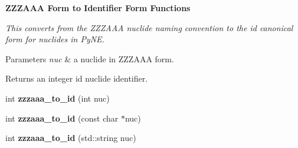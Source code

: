 \begin{Indent}{\bf Z\+Z\+Z\+A\+AA Form to Identifier Form Functions}\par
{\em This converts from the Z\+Z\+Z\+A\+AA nuclide naming convention to the id canonical form for nuclides in Py\+NE. 
\begin{DoxyParams}{Parameters}
{\em nuc} & a nuclide in Z\+Z\+Z\+A\+AA form. \\
\hline
\end{DoxyParams}
\begin{DoxyReturn}{Returns}
an integer id nuclide identifier. 
\end{DoxyReturn}
}\begin{DoxyCompactItemize}
\item 
int {\bfseries zzzaaa\+\_\+to\+\_\+id} (int nuc)\hypertarget{namespacepyne_1_1nucname_a655aba032448b6a33135b0e7a49e98ad}{}\label{namespacepyne_1_1nucname_a655aba032448b6a33135b0e7a49e98ad}

\item 
int {\bfseries zzzaaa\+\_\+to\+\_\+id} (const char $\ast$nuc)\hypertarget{namespacepyne_1_1nucname_a50ceb685138aab76cfa4c65b515fa6a1}{}\label{namespacepyne_1_1nucname_a50ceb685138aab76cfa4c65b515fa6a1}

\item 
int {\bfseries zzzaaa\+\_\+to\+\_\+id} (std\+::string nuc)\hypertarget{namespacepyne_1_1nucname_a1d83a3f4a7cdc8b712077bfb9a5a1963}{}\label{namespacepyne_1_1nucname_a1d83a3f4a7cdc8b712077bfb9a5a1963}

\end{DoxyCompactItemize}
\end{Indent}
